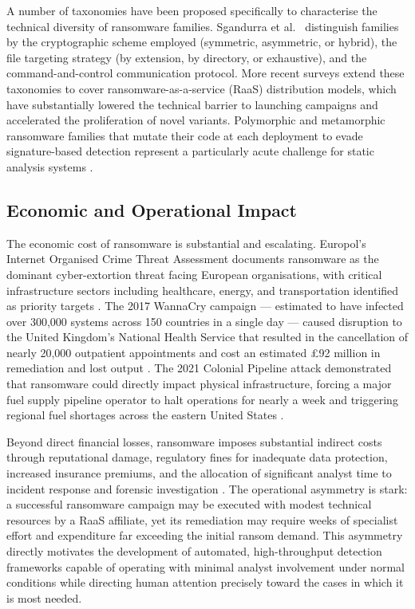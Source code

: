 A number of taxonomies have been proposed specifically to characterise the technical
diversity of ransomware families.
Sgandurra et al.\ \cite{SgandurraMML16} distinguish families by the cryptographic scheme
employed (symmetric, asymmetric, or hybrid), the file targeting strategy (by extension, by
directory, or exhaustive), and the command-and-control communication protocol.
More recent surveys \cite{yumlembam2024comprehensive, Ozkan-Okay2024Survey} extend these
taxonomies to cover ransomware-as-a-service (RaaS) distribution models, which have
substantially lowered the technical barrier to launching campaigns and accelerated the
proliferation of novel variants.
Polymorphic and metamorphic ransomware families that mutate their code at each deployment to
evade signature-based detection represent a particularly acute challenge for static analysis
systems \cite{Urooj2024polymorphism}.

\subsection{Economic and Operational Impact}
\label{sec:lit_impact}

The economic cost of ransomware is substantial and escalating.
Europol's Internet Organised Crime Threat Assessment documents ransomware as the dominant
cyber-extortion threat facing European organisations, with critical infrastructure sectors
including healthcare, energy, and transportation identified as priority targets
\cite{europol2020iocta}.
The 2017 WannaCry campaign — estimated to have infected over 300,000 systems across 150
countries in a single day — caused disruption to the United Kingdom's National Health Service
that resulted in the cancellation of nearly 20,000 outpatient appointments and cost an
estimated \pounds 92 million in remediation and lost output \cite{greenberg2018untold}.
The 2021 Colonial Pipeline attack demonstrated that ransomware could directly impact physical
infrastructure, forcing a major fuel supply pipeline operator to halt operations for nearly a
week and triggering regional fuel shortages across the eastern United States \cite{cdk_global_attack}.

Beyond direct financial losses, ransomware imposes substantial indirect costs through
reputational damage, regulatory fines for inadequate data protection, increased insurance
premiums, and the allocation of significant analyst time to incident response and forensic
investigation \cite{beaman2021ransomware, europol2020iocta}.
The operational asymmetry is stark: a successful ransomware campaign may be executed with
modest technical resources by a RaaS affiliate, yet its remediation may require weeks of
specialist effort and expenditure far exceeding the initial ransom demand.
This asymmetry directly motivates the development of automated, high-throughput detection
frameworks capable of operating with minimal analyst involvement under normal conditions
while directing human attention precisely toward the cases in which it is most needed.

